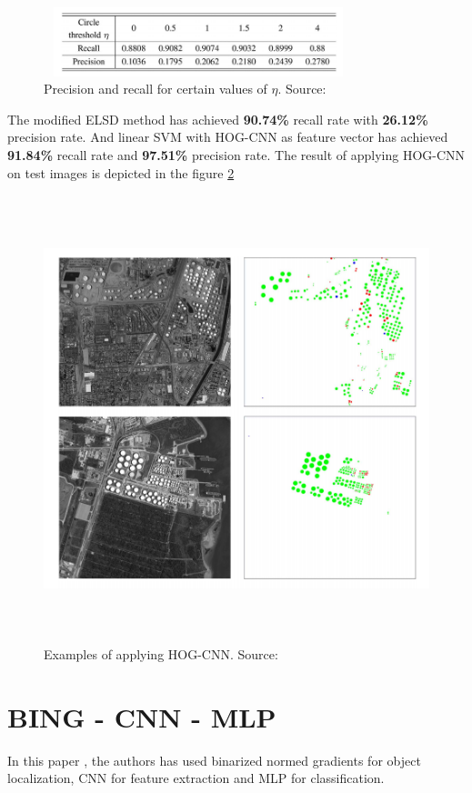 \begin{figure}[!htbp]
\centerline{\includegraphics[height=20mm,width=90mm]{img/fig18.png}}
\caption{Precision and recall for certain values of $\eta$. Source: \cite{b6}}
\label{fig18}
\end{figure}

The modified ELSD method has achieved \textbf{90.74\%} recall rate with \textbf{26.12\%} precision rate. And linear SVM with HOG-CNN as feature vector has achieved \textbf{91.84\%} recall rate and \textbf{97.51\%} precision rate. The result of applying HOG-CNN on test images is depicted in the figure \ref{fig19}

\begin{figure}[!htbp]
\centerline{\includegraphics[height=130mm,width=150mm]{img/fig19.png}}
\caption{Examples of applying HOG-CNN. Source: \cite{b6}}
\label{fig19}
\end{figure}



\section{BING - CNN - MLP}
In this paper \cite{b5}, the authors has used binarized normed gradients for object localization, CNN for feature extraction and MLP for classification. 
